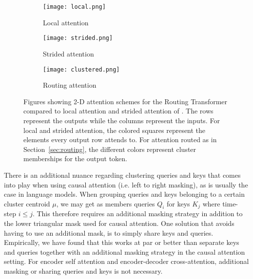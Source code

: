 \documentclass[a4paper]{article}
\begin{document}
\begin{figure*}[h]
\begin{subfigure}{.33\textwidth}
  \centering
  \texttt{[image: local.png]}
  \caption{Local attention}
  \label{fig:sfig1}
\end{subfigure}\begin{subfigure}{.33\textwidth}
  \centering
  \texttt{[image: strided.png]}
  \caption{Strided attention}
  \label{fig:sfig2}
\end{subfigure}
\begin{subfigure}{.33\textwidth}
  \centering
  \texttt{[image: clustered.png]}
  \caption{Routing attention}
  \label{fig:sfig3}
\end{subfigure}
\caption{Figures showing 2-D attention schemes for the Routing Transformer compared to local attention and
strided attention of \cite{child2019generating}. The rows represent the outputs while the columns represent
the inputs. For local and strided attention, the colored squares represent the elements every output row
attends to. For attention routed as in Section~\ref{sec:routing}, the different colors represent cluster memberships
for the output token.}
\label{fig:attention}
\end{figure*}

There is an additional nuance regarding clustering queries and keys that comes into play
when using causal attention (i.e. left to right masking), as is usually the case in language 
models. When grouping queries and keys belonging to a certain cluster centroid \(\mu\), we 
may get as members queries \(Q_i\) for keys \(K_j\) where time-step \(i \le j\). This therefore requires an additional masking strategy in addition to the lower triangular mask 
used for causal attention. One solution that avoids
having to use an additional mask, is to simply share keys and queries. Empirically, we have found that
this works at par or better than separate keys and queries together with an additional masking strategy
in the causal attention setting. For encoder self attention and encoder-decoder cross-attention, additional masking
or sharing queries and keys is not necessary.
\end{document}
